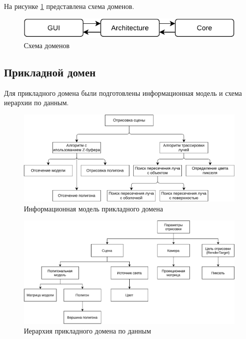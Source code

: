 На рисунке \ref{schema:domen} представлена схема доменов.

\begin{figure}[h]
	\centering
	\includegraphics[width=\linewidth,height=0.85\textheight,keepaspectratio]{diagrams/domens.pdf}
	\caption{Схема доменов}
	\label{schema:domen}
\end{figure}

\subsection{Прикладной домен}

Для прикладного домена были подготовлены информационная модель и схема иерархии по данным.

\begin{figure}[h]
	\centering
	\includegraphics[width=\linewidth,height=0.85\textheight,keepaspectratio]{diagrams/core-info.pdf}
	\caption{Информационная модель прикладного домена}
\end{figure}

\begin{figure}[h]
	\centering
	\includegraphics[width=\linewidth,height=0.85\textheight,keepaspectratio]{diagrams/core-data.pdf}
	\caption{Иерархия прикладного домена по данным}
\end{figure}


